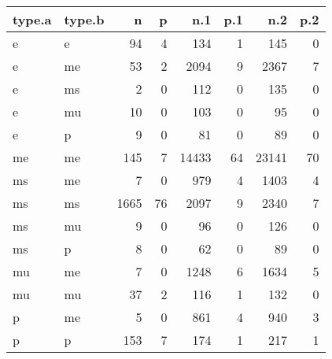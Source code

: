 \captionsetup[table]{labelformat=empty,skip=1pt}
\begin{longtable}{llrrrrrr}
\toprule
type.a & type.b & n & p & n.1 & p.1 & n.2 & p.2 \\ 
\midrule
e & e & 94 & 4 & 134 & 1 & 145 & 0 \\ 
e & me & 53 & 2 & 2094 & 9 & 2367 & 7 \\ 
e & ms & 2 & 0 & 112 & 0 & 135 & 0 \\ 
e & mu & 10 & 0 & 103 & 0 & 95 & 0 \\ 
e & p & 9 & 0 & 81 & 0 & 89 & 0 \\ 
me & me & 145 & 7 & 14433 & 64 & 23141 & 70 \\ 
ms & me & 7 & 0 & 979 & 4 & 1403 & 4 \\ 
ms & ms & 1665 & 76 & 2097 & 9 & 2340 & 7 \\ 
ms & mu & 9 & 0 & 96 & 0 & 126 & 0 \\ 
ms & p & 8 & 0 & 62 & 0 & 89 & 0 \\ 
mu & me & 7 & 0 & 1248 & 6 & 1634 & 5 \\ 
mu & mu & 37 & 2 & 116 & 1 & 132 & 0 \\ 
p & me & 5 & 0 & 861 & 4 & 940 & 3 \\ 
p & p & 153 & 7 & 174 & 1 & 217 & 1 \\ 
 \bottomrule
\end{longtable}

